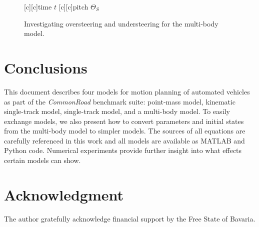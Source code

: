 \documentclass[11pt,a4paper]{article}
\renewcommand{\^}[1]{^{(#1)}}
\begin{document}
\begin{figure}[h!tb]
      [c][c]{time $t$}
      [c][c]{pitch $\Theta_S$}

      \caption{Investigating oversteering and understeering for the multi-body model.}
\end{figure}


\section{Conclusions}

This document describes four models for motion planning of automated vehicles as part of the \textit{CommonRoad} benchmark suite: point-mass model, kinematic single-track model, single-track model, and a multi-body model. To easily exchange models, we also present how to convert parameters and initial states from the multi-body model to simpler models. The sources of all equations are carefully referenced in this work and all models are available as MATLAB and Python code. Numerical experiments provide further insight into what effects certain models can show. 


\section*{Acknowledgment}

\vspace{-0.2cm}
The author gratefully acknowledge financial support by the Free State of Bavaria.



\label{sec:bib}

%
%
%

\end{document}
